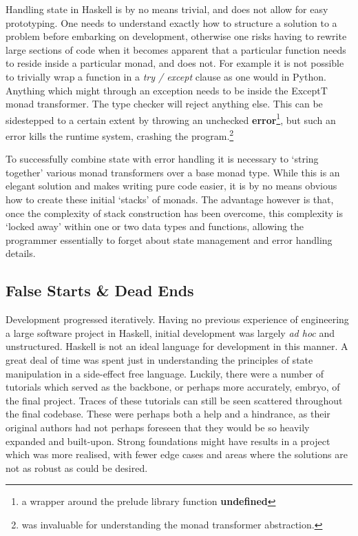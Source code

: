 \documentclass[12pt, a4paper]{report}
\begin{document}
Handling state in Haskell is by no means trivial, and does not allow for easy prototyping. One needs
to understand exactly how to structure a solution to a problem before embarking on development,
otherwise one risks having to rewrite large sections of code when it becomes apparent that a
particular function needs to reside inside a particular monad, and does not. For example it is not
possible to trivially wrap a function in a \textit{try / except} clause as one would in Python.
Anything which might through an exception needs to be inside the ExceptT monad transformer. The type
checker will reject anything else. This can be sidestepped to a certain extent by throwing an
unchecked \textbf{error}\footnote{a wrapper around the prelude library function \textbf{undefined}},
but such an error kills the runtime system, crashing the program.\footnote{\cite{transformers} was
invaluable for understanding the monad transformer abstraction.}

To successfully combine state with error handling it is necessary to `string together' various monad
transformers over a base monad type. While this is an elegant solution and makes writing pure code
easier, it is by no means obvious how to create these initial `stacks' of monads. The advantage
however is that, once the complexity of stack construction has been overcome, this complexity is
`locked away' within one or two data types and functions, allowing the programmer essentially to
forget about state management and error handling details. 

\subsection{False Starts \& Dead Ends}
\label{deadend}
Development progressed iteratively. Having no previous experience of engineering a large software
project in Haskell, initial development was largely \textit{ad hoc} and unstructured. Haskell is not
an ideal language for development in this manner. A great deal of time was spent just in understanding 
the principles of state manipulation in a side-effect free language. Luckily, there were a number of 
tutorials which served as the backbone, or perhaps more accurately, embryo, of the final project. 
Traces of these tutorials can still be seen scattered throughout the final codebase. These were 
perhaps both a help and a hindrance, as their original authors had not perhaps foreseen that 
they would be so heavily expanded and built-upon. Strong foundations might have results in a project 
which was more realised, with fewer edge cases and areas where the solutions are not as robust as could be desired.
\end{document}
